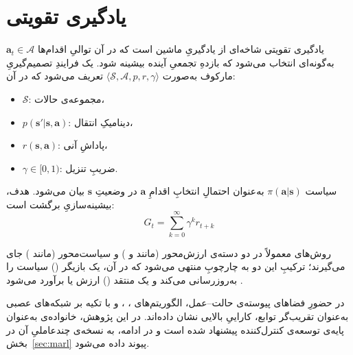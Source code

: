 %

\section{یادگیری تقویتی}\label{sec:rl}

یادگیری تقویتی
 شاخه‌ای از یادگیریِ ماشین است که در آن توالیِ اقدام‌ها $\boldsymbol{a}_t\in\mathcal{A}$ به‌گونه‌ای انتخاب می‌شود که بازدهِ تجمعیِ آینده بیشینه شود. یک فرایندِ تصمیم‌گیریِ مارکوف
  به‌صورت $\langle\mathcal{S},\mathcal{A},p,r,\gamma\rangle$ تعریف می‌شود که در آن:
\begin{itemize}
	\item $\mathcal{S}$:
	 مجموعه‌ی حالات،
	\item $p(\boldsymbol{s}'|\boldsymbol{s},\boldsymbol{a})$:
	 دینامیکِ انتقال،
	\item $r(\boldsymbol{s},\boldsymbol{a})$:
	 پاداشِ آنی،
	\item $\gamma\in[0,1)$:
	 ضریبِ تنزیل.
\end{itemize}
\noindent
سیاست
 $\pi(\boldsymbol{a}|\boldsymbol{s})$ به‌عنوان احتمالِ انتخابِ اقدامِ $\boldsymbol{a}$ در وضعیتِ $\boldsymbol{s}$ بیان می‌شود. هدف، بیشینه‌سازیِ برگشت
 است:
 \begin{equation}
 	G_t=\sum_{k=0}^{\infty}\gamma^k r_{t+k}
 \end{equation}
 
 روش‌های  معمولاً در دو دسته‌ی {ارزش‌محور} (مانند  و ) و {سیاست‌محور} (مانند ) جای می‌گیرند؛ ترکیبِ این دو به چارچوبِ  منتهی می‌شود که در آن، یک بازیگر () سیاست را به‌روزرسانی می‌کند و یک منتقد () ارزش یا  برآورد می‌شود
  \cite{SuttonBarto2018}.

در حضورِ فضاهای پیوسته‌ی حالت–عمل، الگوریتم‌های  ، ،  و  با تکیه بر شبکه‌های عصبی به‌عنوان تقریب‌گر توابع، کاراییِ بالایی نشان داده‌اند. در این پژوهش، خانواده‌ی  به‌عنوان پایه‌ی توسعه‌ی کنترل‌کننده پیشنهاد شده‌ است و در ادامه، به نسخه‌ی چندعاملیِ آن در بخش~\ref{sec:marl} پیوند داده می‌شود.
